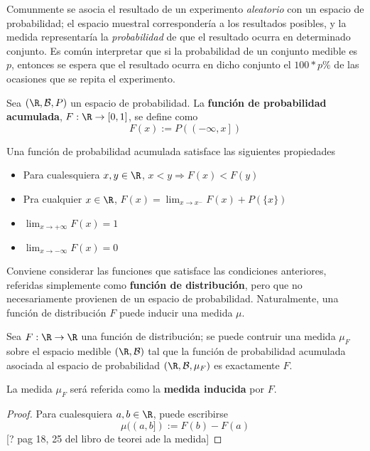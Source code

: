
Comunmente se asocia el resultado de un experimento \textit{aleatorio} con un espacio de probabilidad; el espacio muestral correspondería a los resultados posibles, y la medida representaría la \textit{probabilidad} de que el resultado ocurra en determinado conjunto.
%
Es común interpretar que si la probabilidad de un conjunto medible es $p$, entonces se espera que el resultado ocurra en dicho conjunto el $100*p \%$ de las ocasiones que se repita el experimento.

\begin{definicion}%
Sea $(\R,\mathcal{B},P)$ un espacio de probabilidad. La \textbf{función de probabilidad acumulada}, $F : \R \rightarrow [0,1]$, se define como
\begin{equation*}
F (x) := P\left( \left(-\infty,x \right] \right)
\end{equation*}
\end{definicion}

Una función de probabilidad acumulada satisface las siguientes propiedades
\begin{itemize}
\item Para cualesquiera $x,y\in \R$, $x < y \Rightarrow F(x) < F(y)$
\item Pra cualquier $x\in\R$, $F(x) = \lim_{x\rightarrow x^{-}} F(x) + P(\{x\})$
\item $\lim_{x\rightarrow +\infty} F(x) = 1$
\item $\lim_{x\rightarrow -\infty} F(x) = 0$
\end{itemize}

Conviene considerar las funciones que satisface las condiciones anteriores, referidas simplemente como \textbf{función de distribución}, pero que no necesariamente provienen de un espacio de probabilidad. Naturalmente, una función de distribución $F$ puede inducir una medida $\mu$.

\begin{teorema}
Sea $F:\R \rightarrow \R$ una función de distribución; se puede contruir una medida $\mu_F$ sobre el espacio medible $(\R, \mathcal{B})$ tal que la función de probabilidad acumulada asociada al espacio de probabilidad $(\R, \mathcal{B}, \mu_F)$ es exactamente $F$.

La medida $\mu_F$ será referida como la \textbf{medida inducida} por $F$.
\end{teorema}
\begin{proof}
Para cualesquiera $a, b \in \R$, puede escribirse
\begin{equation}
\mu((a,b]) := F(b) - F(a)
\end{equation}
[? pag 18, 25 del libro de teorei ade la medida]
\end{proof}


